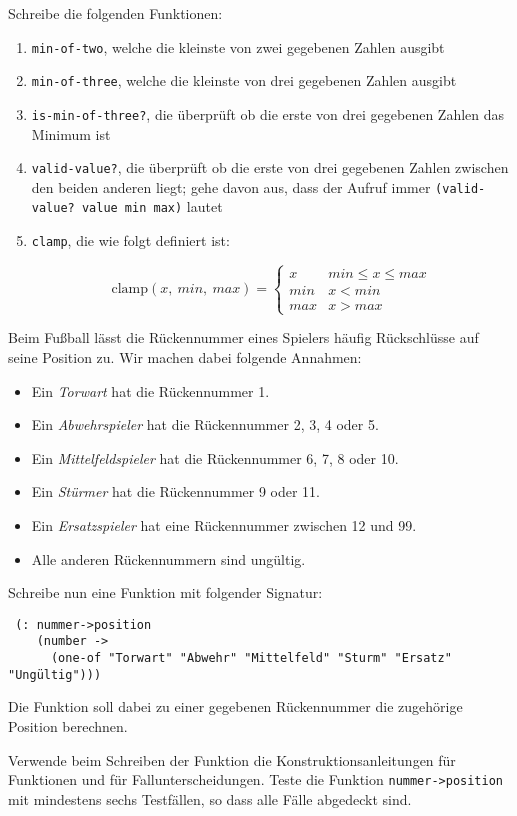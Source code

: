\begin{aufgabe}
  Schreibe die folgenden Funktionen:
  \begin{enumerate}
  \item \texttt{min-of-two}, welche die kleinste von zwei
    gegebenen Zahlen ausgibt
  \item \texttt{min-of-three}, welche die kleinste von drei
    gegebenen Zahlen ausgibt
  \item \texttt{is-min-of-three?}, die überprüft ob die erste
    von drei gegebenen Zahlen das Minimum ist
  \item \texttt{valid-value?}, die überprüft ob die erste von
    drei gegebenen Zahlen zwischen den beiden anderen liegt; gehe
    davon aus, dass der Aufruf immer \texttt{(valid-value? value min max)}
    lautet 
  \item \texttt{clamp}, die wie folgt definiert ist:
    
    \[\text{clamp}(x,\ min,\ max)=
    \begin{cases} 
      x & min \leq x \leq max\\ 
      min & x < min \\ 
      max & x > max 
    \end{cases}
    \]
    
  \end{enumerate}
\end{aufgabe}

\begin{aufgabe}
  Beim Fußball lässt die Rückennummer eines Spielers
  häufig Rückschlüsse auf seine Position zu. Wir machen dabei folgende
  Annahmen:
  \begin{itemize}
  \item Ein \emph{Torwart} hat die Rückennummer 1.
  \item Ein \emph{Abwehrspieler} hat die Rückennummer 2, 3, 4 oder 5.
  \item Ein \emph{Mittelfeldspieler} hat die Rückennummer 6, 7, 8 oder 10.
  \item Ein \emph{Stürmer} hat die Rückennummer 9 oder 11.
  \item Ein \emph{Ersatzspieler} hat eine Rückennummer zwischen 12 und 99.
  \item Alle anderen Rückennummern sind ungültig.
  \end{itemize}
 
  Schreibe nun eine Funktion mit folgender Signatur:
  
  {\small
\begin{verbatim}
 (: nummer->position
    (number ->
      (one-of "Torwart" "Abwehr" "Mittelfeld" "Sturm" "Ersatz" "Ungültig")))
\end{verbatim}
  }

  Die Funktion soll dabei zu einer gegebenen Rückennummer die
  zugehörige Position berechnen.

  Verwende beim Schreiben der Funktion die
  Konstruktionsanleitungen für Funktionen und für
  Fallunterscheidungen.  Teste die Funktion
  \texttt{nummer->position} mit mindestens sechs Testfällen, so dass
  alle Fälle abgedeckt sind.
\end{aufgabe}


